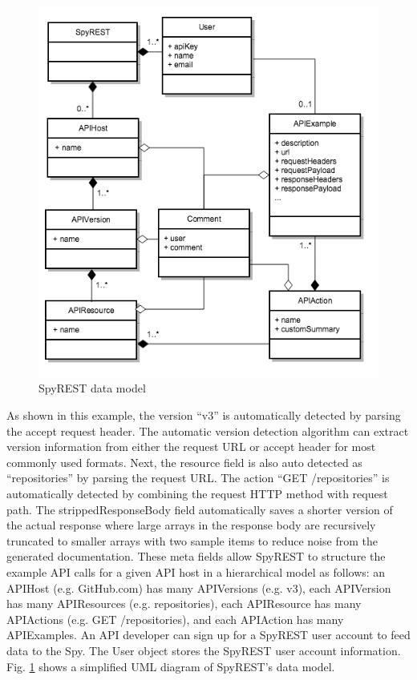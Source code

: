 \documentclass[conference]{IEEEtran}
\begin{document}
\begin{figure}[!tbh]
  \centering
  \includegraphics[width=\linewidth]{data_model.png}
  \caption{SpyREST data model}
  \label{fig:data_model}
\end{figure}


As shown in this example, the version ``v3'' is automatically detected by parsing the accept request header. The automatic version detection algorithm can extract version information from either the request URL or accept header for most commonly used formats. Next, the resource field is also auto detected as ``repositories'' by parsing the request URL. The action ``GET /repositories'' is automatically detected by combining the request HTTP method with request path. The strippedResponseBody field automatically saves a shorter version of the actual response where large arrays in the response body are recursively truncated to smaller arrays with two sample items to reduce noise from the generated documentation. These meta fields allow SpyREST to structure the example API calls for a given API host in a hierarchical model as follows: an APIHost (e.g. GitHub.com) has many APIVersions (e.g. v3), each APIVersion has many APIResources (e.g. repositories), each APIResource has many APIActions (e.g. GET /repositories), and each APIAction has many APIExamples. An API developer can sign up for a SpyREST user account to feed data to the Spy. The User object stores the SpyREST user account information. Fig. \ref{fig:data_model} shows a simplified UML diagram of SpyREST's data model.
\end{document}
